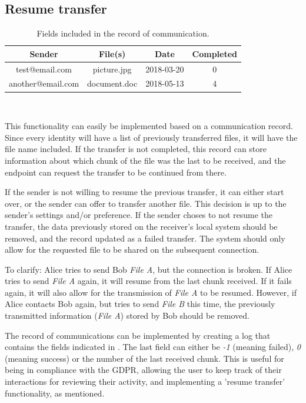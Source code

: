   \subsection{Resume transfer}
  \label{sec:res_trans}
    \begin{table}
      \caption[Record of communication]{Fields included in the record of communication.}
      \label{tab:comm_rec}
      \centering
      \begin{tabular}{cccc}
            \textbf{Sender} & \textbf{File(s)} & \textbf{Date} & Completed \\
            \midrule
            test@email.com & picture.jpg & 2018-03-20 & 0\\
            another@email.com & document.doc & 2018-05-13 & 4\\
            \bottomrule
      \end{tabular}\\
    \end{table}
    This functionality can easily be implemented based on a communication record. Since every identity will have a list of previously transferred files, it will have the file name included. If the transfer is not completed, this record can store information about which chunk of the file was the last to be received, and the endpoint can request the transfer to be continued from there.

    If the sender is not willing to resume the previous transfer, it can either start over, or the sender can offer to transfer another file. This decision is up to the sender's settings and/or preference. If the sender choses to not resume the transfer, the data previously stored on the receiver's local system should be removed, and the record updated as a failed transfer. The system should only allow for the requested file to be shared on the subsequent connection. 

    To clarify: Alice tries to send Bob \emph{File A}, but the connection is broken. If Alice tries to send \emph{File A} again, it will resume from the last chunk received. If it fails again, it will also allow for the transmission of \emph{File A} to be resumed. However, if Alice contacts Bob again, but tries to send \emph{File B} this time, the previously transmitted information (\emph{File A}) stored by Bob should be removed.

    The record of communications can be implemented by creating a log that contains the fields indicated in . The last field can either be \emph{-1} (meaning failed), \emph{0} (meaning success) or the number of the last received chunk. This is useful for being in compliance with the GDPR, allowing the user to keep track of their interactions for reviewing their activity, and implementing a 'resume transfer' functionality, as mentioned.

